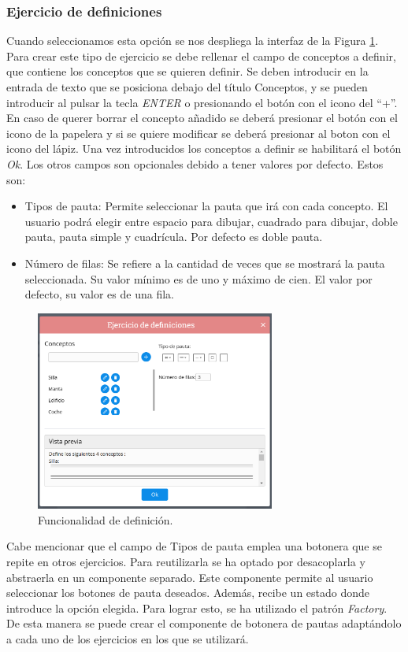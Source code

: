 \subsubsection{Ejercicio de definiciones}
Cuando seleccionamos esta opción se nos despliega la interfaz de la Figura \ref{fig:funcionalidadDefinicion}. Para crear este tipo de ejercicio se debe rellenar el campo de conceptos a definir, que contiene los conceptos que se quieren definir. Se deben introducir en la entrada de texto que se posiciona debajo del título Conceptos, y  se pueden introducir al pulsar  la tecla \textit{ENTER} o presionando el botón con el icono del ``+''. En caso de querer borrar el concepto añadido se deberá presionar el botón con el icono de la papelera y si se quiere modificar se deberá presionar al boton con el icono del lápiz.
Una vez introducidos los conceptos a definir se habilitará el botón \textit{Ok}. Los otros campos son opcionales debido a tener valores por defecto. Estos son:
\begin{itemize}
  \item Tipos de pauta: Permite seleccionar la pauta que irá con cada concepto. El usuario podrá elegir entre espacio para dibujar, cuadrado para dibujar, doble pauta, pauta simple y cuadrícula. Por defecto es doble pauta.
  \item Número de filas: Se refiere a la cantidad de veces que se mostrará la pauta seleccionada. Su valor mínimo es de uno y máximo de cien. El valor por defecto, su valor es de una fila.
\end{itemize}
\begin{figure}[ht!]
  \centering
  \includegraphics[width=0.7\textwidth]{Imagenes/Funcionalidades/EjercicioDefinicion.png}
  \caption{Funcionalidad de definición.}
  \label{fig:funcionalidadDefinicion}
\end{figure}
Cabe mencionar que el campo de Tipos de pauta emplea una botonera que se repite en otros ejercicios. Para reutilizarla se ha optado por desacoplarla y abstraerla en un componente separado. Este componente permite al usuario seleccionar los botones de pauta deseados. Además, recibe un estado donde introduce la opción elegida.
Para lograr esto, se ha utilizado el patrón \textit{Factory}. De esta manera se puede crear el componente de botonera de pautas adaptándolo a cada uno de los ejercicios en los que se utilizará.

